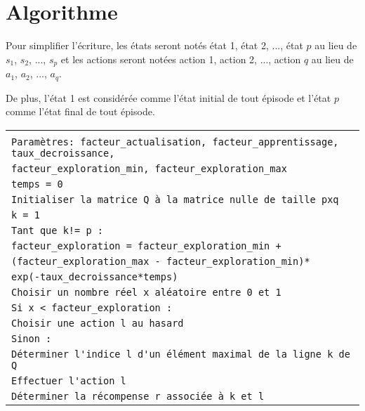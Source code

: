 \section{Algorithme}

Pour simplifier l'écriture, les états seront notés état 1, état 2, ..., état $p$ au lieu de $s_1$, $s_2$, ..., $s_p$ et les actions seront notées action 1, action 2, ..., action $q$ au lieu de $a_1$, $a_2$, ..., $a_q$.

De plus, l'état 1 est considérée comme l'état initial de tout épisode et l'état $p$ comme l'état final de tout épisode. 

\begin{tabular}{|l|}
	\hline \\
	\verb|Paramètres: facteur_actualisation, facteur_apprentissage, taux_decroissance,| \\
	\hfill \verb|facteur_exploration_min, facteur_exploration_max| \\ 
	\verb|temps = 0| \\
	\verb|Initialiser la matrice Q à la matrice nulle de taille pxq| \\
	\verb|k = 1| \\
	\verb|Tant que k!= p :| \\
	\hspace{1cm} \verb|facteur_exploration = facteur_exploration_min +| \\
	\hfill \verb|(facteur_exploration_max - facteur_exploration_min)*| \\
	\hfill \verb|exp(-taux_decroissance*temps)| \\
	\hspace{1cm} \verb|Choisir un nombre réel x aléatoire entre 0 et 1| \\
	\hspace{1cm} \verb|Si x < facteur_exploration :| \\
	\hspace{2cm} \verb|Choisir une action l au hasard| \\
	\hspace{1cm} \verb|Sinon :| \\
	\hspace{2cm} \verb|Déterminer l'indice l d'un élément maximal de la ligne k de Q| \\
	\hspace{1cm} \verb|Effectuer l'action l| \\
	\hspace{1cm} \verb|Déterminer la récompense r associée à k et l| \\

\end{tabular}
